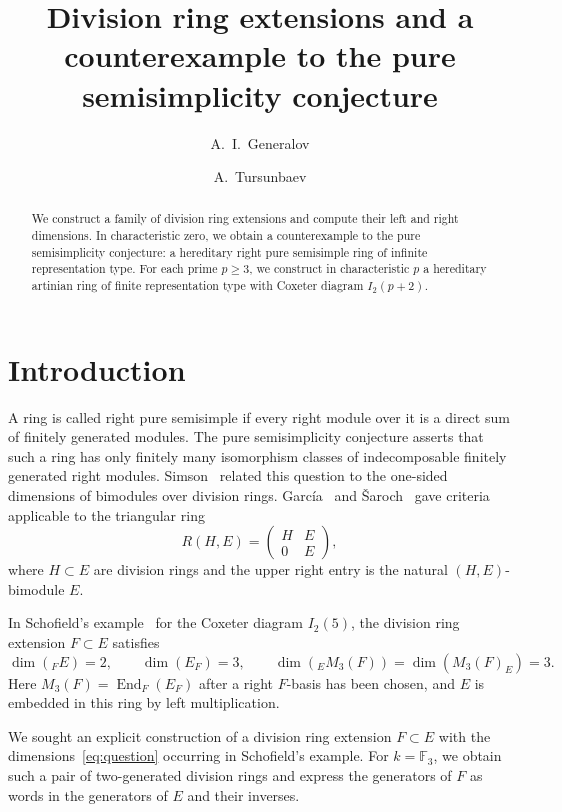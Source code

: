 \documentclass[11pt,a4paper,reqno]{amsart}
\title[Division ring extensions and pure semisimplicity]
{Division ring extensions and a counterexample to the pure semisimplicity conjecture}
\author{A.~I.~Generalov}
\author{A.~Tursunbaev}
\numberwithin{equation}{section}
\theoremstyle{remark}
\newcommand{\End}{\operatorname{End}}
\begin{document}
\begin{abstract}
We construct a family of division ring extensions and compute their left and right dimensions. In characteristic zero, we obtain a counterexample to the pure semisimplicity conjecture: a hereditary right pure semisimple ring of infinite representation type. For each prime $p\ge3$,
we construct in characteristic $p$ a hereditary artinian ring of finite representation type with Coxeter diagram $I_2(p+2)$.
\end{abstract}
\maketitle

\section{Introduction}

A ring is called right pure semisimple if every right module over it
is a direct sum of finitely generated modules.
The pure semisimplicity conjecture asserts that such a ring has only finitely many
isomorphism classes of indecomposable finitely generated right modules.
Simson~\cite{Sim} related this question to the one-sided dimensions of bimodules
over division rings. Garc\'ia~\cite[\S\,6]{Gar} and \v{S}aroch~\cite[Proposition~1.2]{Sar}
gave criteria applicable to the triangular ring
\[
 R(H,E)=\begin{pmatrix}H&E\\0&E\end{pmatrix},
\]
where $H\subset E$ are division rings and the upper right entry is the natural
$(H,E)$-bimodule $E$.

In Schofield's example~\cite[\S\,3, p.~420]{Sch} for the Coxeter
diagram $I_2(5)$, the division ring extension $F\subset E$ satisfies
\begin{equation}\label{eq:question}
 \dim({}_F E)=2,\qquad \dim(E_F)=3,\qquad
 \dim({}_E M_3(F))=\dim(M_3(F)_E)=3 .
\end{equation}
Here $M_3(F)=\End_F(E_F)$ after a right $F$-basis has been chosen,
and $E$ is embedded in this ring by left multiplication.

We sought an explicit construction of a division ring extension $F\subset E$ with the
dimensions~\eqref{eq:question} occurring in Schofield's example.
For $k=\mathbb F_3$, we obtain such a pair of two-generated division rings and express
the generators of $F$ as words in the generators of $E$ and their inverses.
\end{document}
